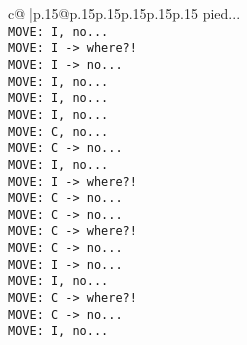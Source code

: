 \documentclass{article}
\begin{document}
{\begin{supertabular}{c@{$\;$}|p{.15\linewidth}@{}p{.15\linewidth}p{.15\linewidth}p{.15\linewidth}p{.15\linewidth}p{.15\linewidth}}
{{{pied...\\ \tt  MOVE: I, no...\\ \tt  MOVE: I -> where?!\\ \tt  MOVE: I -> no...\\ \tt  MOVE: I, no...\\ \tt  MOVE: I, no...\\ \tt  MOVE: I, no...\\ \tt  MOVE: C, no...\\ \tt  MOVE: C -> no...\\ \tt  MOVE: I, no...\\ \tt  MOVE: I -> where?!\\ \tt  MOVE: C -> no...\\ \tt  MOVE: C -> no...\\ \tt  MOVE: C -> where?!\\ \tt  MOVE: C -> no...\\ \tt  MOVE: I -> no...\\ \tt  MOVE: I, no...\\ \tt  MOVE: C -> where?!\\ \tt  MOVE: C -> no...\\ \tt  MOVE: I, no...\\ \tt}}}
\end{supertabular}}
\end{document}
